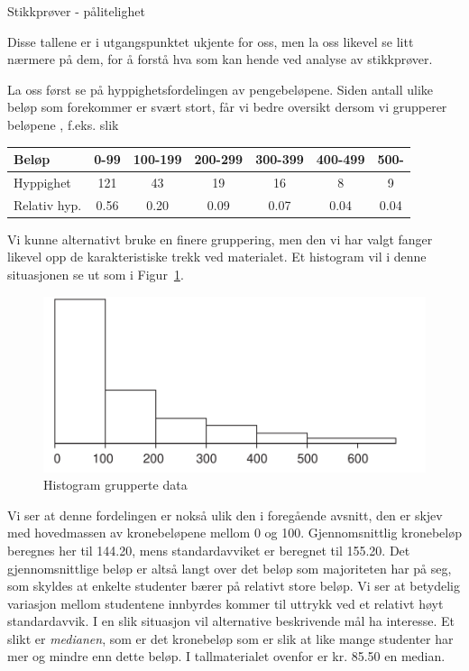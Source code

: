 \begin{eksempel}{Stikkprøver - pålitelighet}
                                       
\noindent Disse tallene er i utgangspunktet ukjente for oss, men la oss likevel
se litt nærmere på dem, for å forstå hva som kan
hende ved analyse av stikkprøver.

La oss først se på hyppighetsfordelingen av pengebeløpene. 
Siden antall ulike beløp som forekommer er svært stort, 
får vi bedre oversikt dersom vi grupperer beløpene , f.eks. slik

\begin{center} 
 \begin{tabular}{l|cccccc}
Beløp  & 0-99 & 100-199 & 200-299 & 300-399 & 400-499 & 500-  \\ \hline
Hyppighet & 121&   43    &   19    &   16    &    8    &   9    \\
Relativ hyp.& 0.56  & 0.20 &  0.09 &  0.07  &  0.04  & 0.04  \\ \hline
 \end{tabular}
\end{center}

\noindent Vi kunne alternativt bruke en finere gruppering, men den vi har
valgt fanger likevel opp de karakteristiske trekk ved materialet. 
Et histogram vil i denne situasjonen se ut som i Figur~\ref{fig:hist_grupperte}.                   
            
\begin{figure}[ht]
\centering\centering 
\includegraphics[scale=0.7]{figurer/fig1_3.pdf}
 \caption{Histogram grupperte data}
	\label{fig:hist_grupperte}
\end{figure}

Vi ser at denne fordelingen er nokså ulik den i foregående
avsnitt, den er skjev med hovedmassen av kronebeløpene mellom 0
og 100.  Gjennomsnitt\-lig kronebeløp beregnes her til 144.20, mens
standardavviket er beregnet til 155.20.  Det gjennomsnittlige
beløp er altså langt over det beløp som majoriteten har på seg,
som skyldes at enkelte studenter bærer på relativt store
beløp.  Vi ser at betydelig variasjon mellom studentene
innbyrdes kommer til uttrykk ved et relativt høyt standardavvik. 
I en slik situasjon vil alternative beskrivende mål ha interesse.
Et slikt er {\em medianen}, som er det kronebeløp som er slik at like
mange studenter har mer og mindre enn dette beløp.  I tallmaterialet
ovenfor er kr. 85.50 en median.                   


\end{eksempel}
